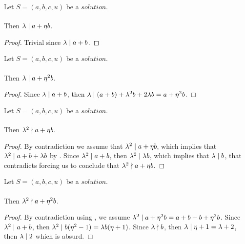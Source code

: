 \begin{lemma}
    \label{lmm:lambda_dvd_a_add_eta_mul_b}
    \leanok
    Let $S=(a, b, c, u)$ be a $solution$.\\\\
    Then $\lambda \mid a + \eta  b$.
\end{lemma}
\begin{proof}
    \leanok
    Trivial since $\lambda \mid a+b$.
\end{proof}

\begin{lemma}
    \label{lmm:lambda_dvd_a_add_eta_sq_mul_b}
    \leanok
    Let $S=(a, b, c, u)$ be a $solution$.\\\\
    Then $\lambda \mid a + \eta^2  b$.
\end{lemma}
\begin{proof}
    \leanok
    Since $\lambda \mid a+b$, then
    $\lambda \mid (a + b) + \lambda^2  b + 2  \lambda  b
    = a + \eta^2  b$.
\end{proof}

\begin{lemma}
    \label{lmm:lambda_sq_not_dvd_a_add_eta_mul_b}
    \leanok
    Let $S=(a, b, c, u)$ be a $solution$.\\\\
    Then $\lambda^2 \nmid a + \eta b$.
\end{lemma}
\begin{proof}
    \leanok
    By contradiction we assume that $\lambda^2 \mid a + \eta b$, which implies that
    $\lambda^2 \mid a + b + \lambda  b$ by .
    Since $\lambda^2 \mid a+b$, then $\lambda^2 \mid \lambda  b$, which implies that
    $\lambda \mid b$, that contradicts  forcing us to conclude that
    $\lambda^2 \nmid a + \eta b$.
\end{proof}

\begin{lemma}
    \label{lmm:lambda_sq_not_dvd_a_add_eta_sq_mul_b}
    \leanok
    Let $S=(a, b, c, u)$ be a $solution$.\\\\
    Then $\lambda^2 \nmid a + \eta^2  b$.
\end{lemma}
\begin{proof}
    \leanok
    By contradiction using , we assume
    $\lambda^2 \mid a +\eta^2 b = a + b -b + \eta^2  b$.
    Since $\lambda^2 \mid a+b$, then $\lambda^2 \mid b (\eta^2 -1)
    = \lambda b (\eta + 1)$. Since $\lambda \nmid b$, then
    $\lambda \mid \eta+1 = \lambda +2$, then $\lambda \mid 2$ which is absurd.
\end{proof}

